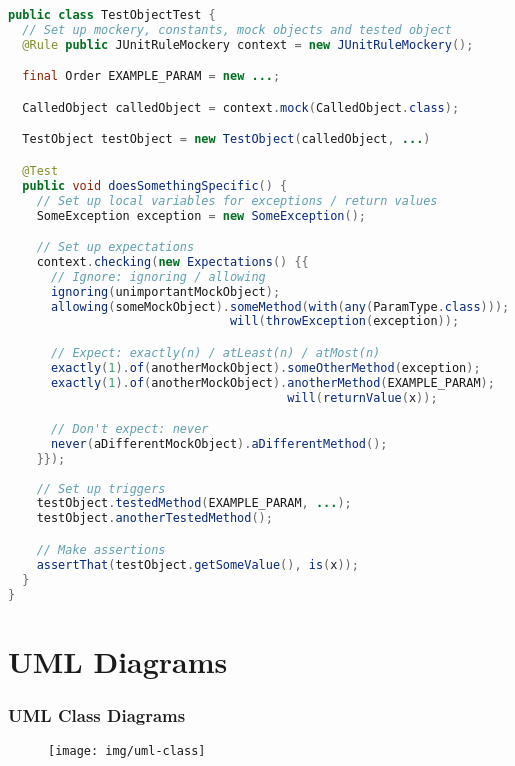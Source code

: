 \documentclass[twocolumn,english]{article}
\begin{document}
\begin{lstlisting}[language=Java,basicstyle={\footnotesize\ttfamily},commentstyle={\color{gray}\itshape}]
public class TestObjectTest {
  // Set up mockery, constants, mock objects and tested object
  @Rule public JUnitRuleMockery context = new JUnitRuleMockery();

  final Order EXAMPLE_PARAM = new ...;

  CalledObject calledObject = context.mock(CalledObject.class);

  TestObject testObject = new TestObject(calledObject, ...)

  @Test
  public void doesSomethingSpecific() {
    // Set up local variables for exceptions / return values
    SomeException exception = new SomeException();

    // Set up expectations
    context.checking(new Expectations() {{
      // Ignore: ignoring / allowing
      ignoring(unimportantMockObject);
      allowing(someMockObject).someMethod(with(any(ParamType.class)));
                               will(throwException(exception));

      // Expect: exactly(n) / atLeast(n) / atMost(n)
      exactly(1).of(anotherMockObject).someOtherMethod(exception);
      exactly(1).of(anotherMockObject).anotherMethod(EXAMPLE_PARAM);
                                       will(returnValue(x));

      // Don't expect: never
      never(aDifferentMockObject).aDifferentMethod();
    }});
    
    // Set up triggers
    testObject.testedMethod(EXAMPLE_PARAM, ...);
    testObject.anotherTestedMethod();

    // Make assertions
    assertThat(testObject.getSomeValue(), is(x));
  }
}
\end{lstlisting}



\section{UML Diagrams}


\subsubsection*{UML Class Diagrams}

\begin{figure}[H]
\centering{}\texttt{[image: img/uml-class]} 
\end{figure}
\end{document}
